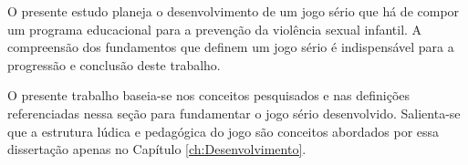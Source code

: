O presente estudo planeja o desenvolvimento de um jogo sério que há de compor um programa educacional para a prevenção da violência sexual infantil. A compreensão dos fundamentos que definem um jogo sério é indispensável para a progressão e conclusão deste trabalho. 

O presente trabalho baseia-se nos conceitos pesquisados e nas definições referenciadas nessa seção para fundamentar o jogo sério desenvolvido. Salienta-se que a estrutura lúdica e pedagógica do jogo são conceitos abordados por essa dissertação apenas no Capítulo \ref{ch:Desenvolvimento}.




\newpage




























